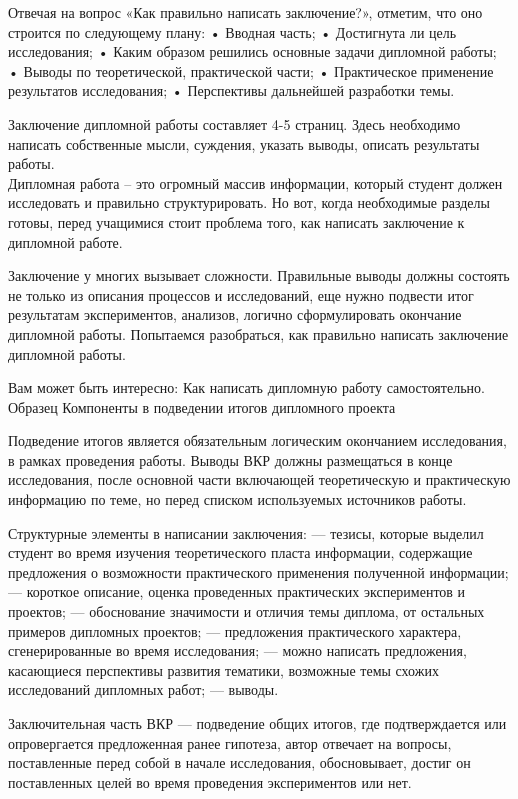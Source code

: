 
Отвечая на вопрос «Как правильно написать заключение?», отметим, что оно строится по следующему плану:
•    Вводная часть;
•    Достигнута ли цель исследования;
•    Каким образом решились основные задачи дипломной работы;
•    Выводы по теоретической, практической части;
•    Практическое применение результатов исследования;
•    Перспективы дальнейшей разработки темы.

Заключение дипломной работы составляет 4-5 страниц. Здесь необходимо написать собственные мысли, суждения, указать  выводы, описать результаты работы.
\\
Дипломная работа – это огромный массив информации, который студент должен исследовать и правильно структурировать. Но вот, когда необходимые разделы готовы, перед учащимися стоит проблема того, как написать заключение к дипломной работе.

Заключение у многих вызывает сложности. Правильные выводы должны состоять не только из описания процессов и исследований, еще нужно подвести итог результатам экспериментов, анализов, логично сформулировать окончание дипломной работы.
Попытаемся разобраться, как правильно написать заключение дипломной работы.

Вам может быть интересно: Как написать дипломную работу самостоятельно. Образец
Компоненты в подведении итогов дипломного проекта

Подведение итогов является обязательным логическим окончанием исследования, в рамках проведения работы. Выводы ВКР должны размещаться в конце исследования, после основной части включающей теоретическую и практическую информацию по теме, но перед списком используемых источников работы.

Структурные элементы в написании заключения:
—    тезисы, которые выделил студент во время изучения теоретического пласта информации, содержащие предложения о возможности практического применения полученной информации;
—    короткое описание, оценка проведенных практических экспериментов и проектов;
—    обоснование значимости и отличия темы диплома, от остальных примеров дипломных проектов;
—    предложения практического характера, сгенерированные во время исследования;
—    можно написать предложения, касающиеся перспективы развития тематики, возможные темы схожих исследований дипломных работ;
—    выводы.

Заключительная часть ВКР — подведение общих итогов, где подтверждается или опровергается предложенная ранее гипотеза, автор отвечает на вопросы, поставленные перед собой в начале исследования, обосновывает, достиг он поставленных целей во время проведения экспериментов или нет.

